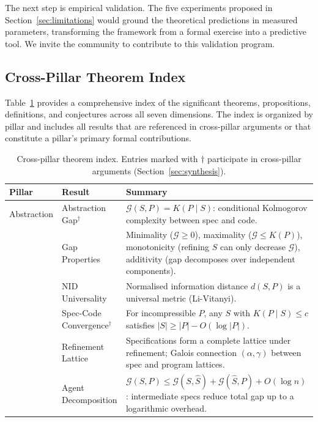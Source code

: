 \documentclass[11pt, a4paper, logo, copyright]{googledeepmind}
\begin{document}
The next step is empirical validation. The five experiments proposed in Section~\ref{sec:limitations} would ground the theoretical predictions in measured parameters, transforming the framework from a formal exercise into a predictive tool. We invite the community to contribute to this validation program.


\begin{appendices}

\section{Cross-Pillar Theorem Index}
\label{app:theorems}

Table~\ref{tab:theorem-index} provides a comprehensive index of the significant theorems, propositions, definitions, and conjectures across all seven dimensions. The index is organized by pillar and includes all results that are referenced in cross-pillar arguments or that constitute a pillar's primary formal contributions.

\scriptsize
\begin{longtable}{p{1.6cm}p{3.2cm}p{7.8cm}}
\caption{Cross-pillar theorem index. Entries marked with $\dagger$ participate in cross-pillar arguments (Section~\ref{sec:synthesis}).}
\label{tab:theorem-index} \\
\toprule
\textbf{Pillar} & \textbf{Result} & \textbf{Summary} \\
\midrule

Abstraction
    & Abstraction Gap$^\dagger$ & $\mathcal{G}(S,P) = K(P \mid S)$: conditional Kolmogorov complexity between spec and code. \\
    & Gap Properties & Minimality ($\mathcal{G} \geq 0$), maximality ($\mathcal{G} \leq K(P)$), monotonicity (refining $S$ can only decrease $\mathcal{G}$), additivity (gap decomposes over independent components). \\
    & NID Universality & Normalised information distance $d(S,P)$ is a universal metric (Li-Vitanyi). \\
    & Spec-Code Convergence$^\dagger$ & For incompressible $P$, any $S$ with $K(P \mid S) \leq c$ satisfies $|S| \geq |P| - O(\log |P|)$. \\
    & Refinement Lattice & Specifications form a complete lattice under refinement; Galois connection $(\alpha, \gamma)$ between spec and program lattices. \\
    & Agent Decomposition & $\mathcal{G}(S,P) \leq \mathcal{G}(S, \hat{S}) + \mathcal{G}(\hat{S}, P) + O(\log n)$: intermediate specs reduce total gap up to a logarithmic overhead. \\


\end{longtable}
\end{appendices}
\end{document}

